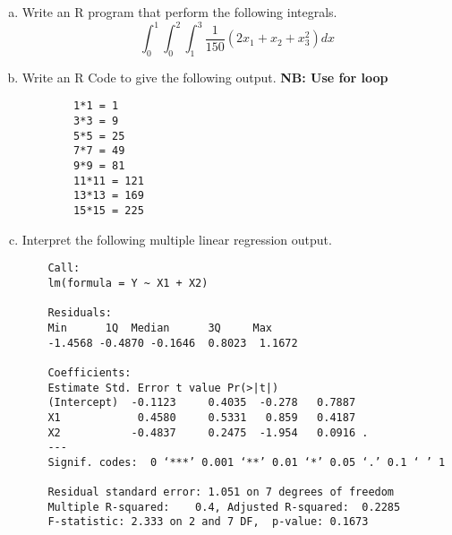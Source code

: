 \begin{enumerate}[(a)]
	\item Write an R program that perform the following integrals. 
	$$\int_{0}^{1} \int_{0}^{2} \int_{1}^{3} \frac{1}{150} (2x_{1}+ x_{2} + x_{3}^{2})dx$$
	\item Write an R Code to give the following output. \textbf{NB: Use for loop}
	\begin{verbatim}
		1*1 = 1
		3*3 = 9
		5*5 = 25
		7*7 = 49
		9*9 = 81
		11*11 = 121
		13*13 = 169
		15*15 = 225
	\end{verbatim}
\item Interpret the following multiple linear regression output. 
\begin{verbatim}
	Call:
	lm(formula = Y ~ X1 + X2)
	
	Residuals:
	Min      1Q  Median      3Q     Max 
	-1.4568 -0.4870 -0.1646  0.8023  1.1672 
	
	Coefficients:
	Estimate Std. Error t value Pr(>|t|)  
	(Intercept)  -0.1123     0.4035  -0.278   0.7887  
	X1            0.4580     0.5331   0.859   0.4187  
	X2           -0.4837     0.2475  -1.954   0.0916 .
	---
	Signif. codes:  0 ‘***’ 0.001 ‘**’ 0.01 ‘*’ 0.05 ‘.’ 0.1 ‘ ’ 1
	
	Residual standard error: 1.051 on 7 degrees of freedom
	Multiple R-squared:    0.4,	Adjusted R-squared:  0.2285 
	F-statistic: 2.333 on 2 and 7 DF,  p-value: 0.1673
\end{verbatim}
\end{enumerate}
